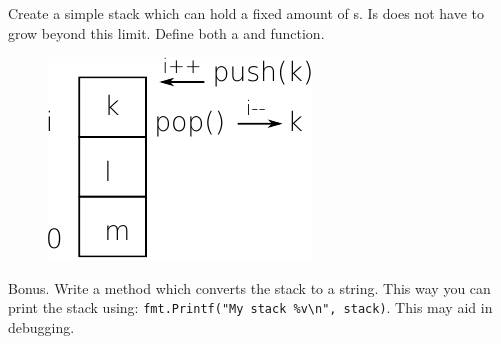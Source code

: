\begin{Exercise}[title={Stack},difficulty=5]
\label{ex:stack}
\Question \label{ex:stack q1} Create a simple stack which can hold a
fixed amount of s. Is does not have to grow beyond this limit.
Define both a  and  function.

\begin{figure}
\begin{center}
\includegraphics[scale=0.50]{fig/stack.pdf}
\end{center}
\end{figure}

\Question \label{ex:stack q2} Bonus. Write a  method which 
converts the stack to a string. This way you can print the stack using:
\lstinline{fmt.Printf("My stack %v\n", stack)}. This may aid in
debugging.
\end{Exercise}

\begin{Answer}

\Question 

\Question 

\end{Answer}
